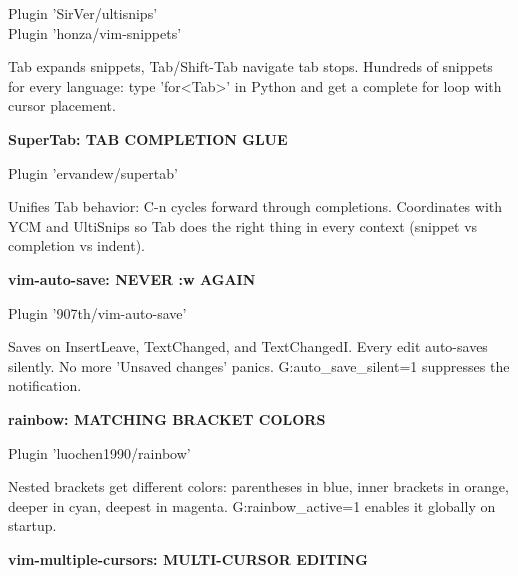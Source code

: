 \documentclass[11pt,a4paper,twoside]{book}
\begin{document}
\begin{codebox}
\color{neongreen}Plugin 'SirVer/ultisnips'\\
\color{neongreen}Plugin 'honza/vim-snippets'\\
\end{codebox}

Tab expands snippets, Tab/Shift-Tab navigate tab stops. Hundreds of snippets for every language: type 'for<Tab>' in Python and get a complete for loop with cursor placement.


\vspace{12pt}
{\bfseries\color{neonyellow} SuperTab: TAB COMPLETION GLUE}\vspace{4pt}

\begin{codebox}
\color{neongreen}Plugin 'ervandew/supertab'\\
\end{codebox}

Unifies Tab behavior: C-n cycles forward through completions. Coordinates with YCM and UltiSnips so Tab does the right thing in every context (snippet vs completion vs indent).


\vspace{12pt}
{\bfseries\color{neonyellow} vim-auto-save: NEVER :w AGAIN}\vspace{4pt}

\begin{codebox}
\color{neongreen}Plugin '907th/vim-auto-save'\\
\end{codebox}

Saves on InsertLeave, TextChanged, and TextChangedI. Every edit auto-saves silently. No more 'Unsaved changes' panics. G:auto\_save\_silent=1 suppresses the notification.


\vspace{12pt}
{\bfseries\color{neonyellow} rainbow: MATCHING BRACKET COLORS}\vspace{4pt}

\begin{codebox}
\color{neongreen}Plugin 'luochen1990/rainbow'\\
\end{codebox}

Nested brackets get different colors: parentheses in blue, inner brackets in orange, deeper in cyan, deepest in magenta. G:rainbow\_active=1 enables it globally on startup.


\vspace{12pt}
{\bfseries\color{neonyellow} vim-multiple-cursors: MULTI-CURSOR EDITING}\vspace{4pt}
\end{document}
